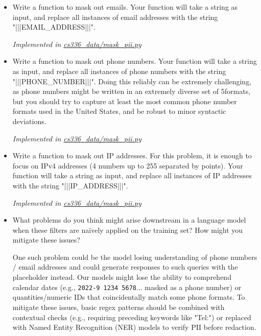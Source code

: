\documentclass[letterpaper]{article}
\begin{document}
\begin{itemize}
	\item[(a)] Write a function to mask out emails. Your function will take a string as input, and replace all instances of email addresses with the string "|||EMAIL\_ADDRESS|||".

	\textit{Implemented in  \href{https://github.com/echung32/ece405-assignment2-data/blob/main/cs336_data/mask\_pii.py}{cs336\_data/mask\_pii.py}}

	\item[(b)] Write a function to mask out phone numbers. Your function will take a string as input, and replace
	all instances of phone numbers with the string "|||PHONE\_NUMBER|||". Doing this reliably can
	be extremely challenging, as phone numbers might be written in an extremely diverse set of
	5formats, but you should try to capture at least the most common phone number formats used in
	the United States, and be robust to minor syntactic deviations.

	\textit{Implemented in  \href{https://github.com/echung32/ece405-assignment2-data/blob/main/cs336_data/mask\_pii.py}{cs336\_data/mask\_pii.py}}

	\item[(c)] Write a function to mask out IP addresses. For this problem, it is enough to focus on IPv4
	addresses (4 numbers up to 255 separated by points). Your function will take a string as input,
	and replace all instances of IP addresses with the string "|||IP\_ADDRESS|||".

	\textit{Implemented in  \href{https://github.com/echung32/ece405-assignment2-data/blob/main/cs336_data/mask\_pii.py}{cs336\_data/mask\_pii.py}}

	\item[(d)] What problems do you think might arise downstream in a language model when these filters are naïvely applied on the training set? How might you mitigate these issues?

	One such problem could be the model losing understanding of phone numbers / email addresses and could generate responses to such queries with the placeholder instead. Our models might lose the ability to comprehend calendar dates (e.g., \verb|2022-9 1234 5678|... masked as a phone number) or quantities/numeric IDs that coincidentally match some phone formats. To mitigate these issues, basic regex patterns should be combined with contextual checks (e.g., requiring preceding keywords like "Tel:") or replaced with Named Entity Recognition (NER) models to verify PII before redaction.


\end{itemize}
\end{document}
